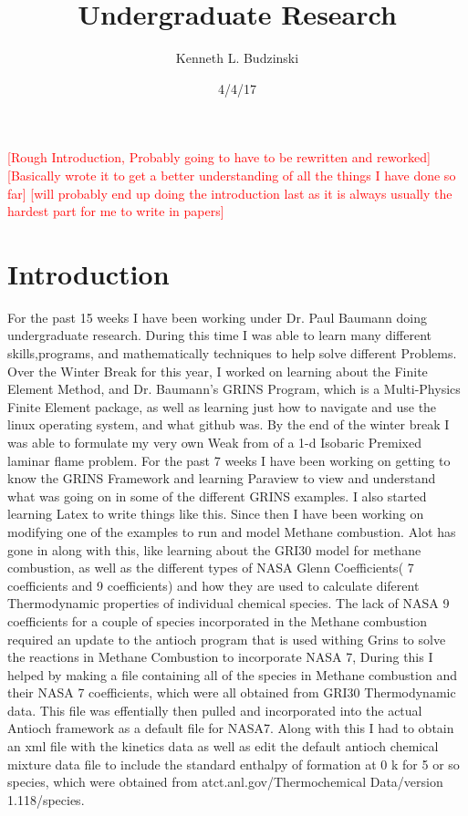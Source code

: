 \documentclass{article}
\title{Undergraduate Research}
\author{Kenneth L. Budzinski}
\date{4/4/17}
\newcommand{\red}[1]{\textcolor{red}{[#1]}} %
\begin{document}
\maketitle
\tableofcontents

\vspace{8mm}
\red{Rough Introduction, Probably going to have to be rewritten and reworked}
\red{Basically wrote it to get a better understanding of all the things I have done so far}
\red{will probably end up doing the introduction last as it is always usually the hardest part for me to write in papers}
\vspace{5mm}

\section{Introduction}
For the past 15 weeks I have been working under Dr. Paul Baumann doing undergraduate research. During this time I was able to learn many different skills,programs, and mathematically techniques to help solve different Problems. Over the Winter Break for this year, I worked on learning about the Finite Element Method, and Dr. Baumann's GRINS Program, which is a Multi-Physics Finite Element package, as well as learning just how to navigate and use the linux operating system, and what github was. By the end of the winter break I was able to formulate my very own Weak from of a 1-d Isobaric Premixed laminar flame problem. For the past 7 weeks I have been working on getting to know the GRINS Framework and learning Paraview to view and understand what was going on in some of the different GRINS examples. I also started learning Latex to write things like this. Since then I have been working on modifying one of the examples to run and model Methane combustion. Alot has gone in along with this, like learning about the GRI30 model for methane combustion, as well as the different types of NASA Glenn Coefficients( 7 coefficients and 9 coefficients) and how they are used to calculate diferent Thermodynamic properties of individual chemical species. The lack of NASA 9 coefficients for a couple of species incorporated in the Methane combustion required an update to the antioch program that is used withing Grins to solve the reactions in Methane Combustion to incorporate NASA 7, During this I helped by making a file containing all of the species in Methane combustion and their NASA 7 coefficients, which were all obtained from GRI30 Thermodynamic data. This file was effentially then pulled and incorporated into the actual Antioch framework as a default file for NASA7. Along with this I had to obtain an xml file with the kinetics data as well as edit the default antioch chemical mixture data file to include the standard enthalpy of formation at 0 k for 5 or so species, which were obtained from atct.anl.gov/Thermochemical Data/version 1.118/species.
\end{document}
